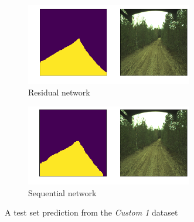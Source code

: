\documentclass[USenglish]{ifimaster}  %
\begin{document}
\begin{figure}[H]
\centering
\begin{subfigure}[b]{\textwidth}
\centering
\includegraphics[width=0.8\textwidth]{bilder/custom_1/185_residual.png}
\caption{Residual network}
\label{fig:custom_1_res}
\end{subfigure}
\hfill
\begin{subfigure}[b]{\textwidth}
\centering
\includegraphics[width=0.8\textwidth]{bilder/custom_1/185_sequential.png}
\caption{Sequential network}
\label{fig:custom_1_seq}
\end{subfigure}
\caption{A test set prediction from the \textit{Custom 1} dataset}
\end{figure}
\end{document}
